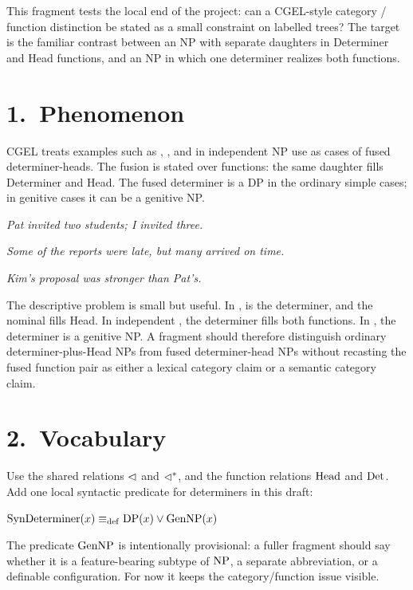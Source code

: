 \documentclass[11pt]{article}
\newcommand{\GenNP}{\Cat{GenNP}}
\newcommand{\SynDmr}{\mathrm{SynDeterminer}}
\begin{document}
\fragmenthead

\noindent
This fragment tests the local end of the project: can a CGEL-style category /
function distinction be stated as a small constraint on labelled trees? The
target is the familiar contrast between an NP with separate daughters in
Determiner and Head functions, and an NP in which one determiner realizes both
functions.

\section*{1.~Phenomenon}

CGEL treats examples such as , , and
 in independent NP use as cases of fused determiner-heads. The
fusion is stated over functions: the same daughter fills Determiner and Head.
The fused determiner is a DP in the ordinary simple cases; in genitive cases it
can be a genitive NP.

\ea\label{ex:fused-three} \textit{Pat invited two students; I invited three.}\z

\ea\label{ex:fused-many} \textit{Some of the reports were late, but many arrived on time.}\z

\ea\label{ex:fused-genitive} \textit{Kim's proposal was stronger than Pat's.}\z

The descriptive problem is small but useful. In ,
 is the determiner, and the nominal  fills Head.
In independent , the determiner fills both functions. In
, the determiner is a genitive NP. A fragment should therefore
distinguish ordinary determiner-plus-Head NPs from fused determiner-head NPs
without recasting the fused function pair as either a lexical category claim or
a semantic category claim.

\section*{2.~Vocabulary}

Use the shared relations $\mathrel{\lhd}$ and $\mathrel{\lhd^{*}}$, and the function relations
$\mathrm{Head}$ and $\mathrm{Det}$. Add one local syntactic predicate for determiners in this
draft:

\ea\label{ex:determiner-predicate}
$\SynDmr(x) \defas \DP(x) \vee \GenNP(x)$\\
\z

The predicate $\GenNP$ is intentionally provisional: a fuller fragment should
say whether it is a feature-bearing subtype of $\mathrm{NP}$, a separate abbreviation,
or a definable configuration. For now it keeps the category/function issue
visible.
\end{document}
